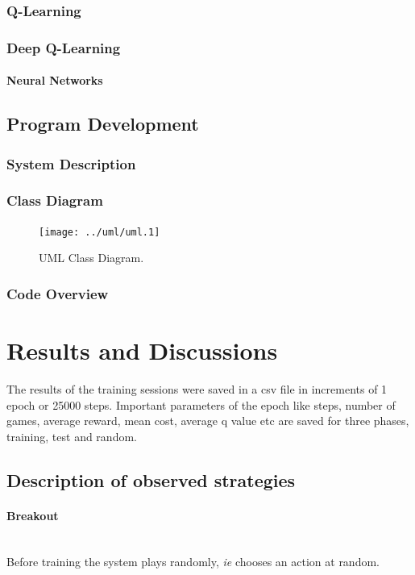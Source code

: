 \documentclass[a4paper,11pt]{article}
\newcommand{\mparagraph}[1]{\paragraph{#1}\mbox{}\\}
\begin{document}
			\subsubsection{Q-Learning}
			\subsubsection{Deep Q-Learning}
				\paragraph{Neural Networks}

		\subsection{Program Development}
			\subsubsection{System Description}
			\subsubsection{Class Diagram}
				\begin{figure}[!h]
					\begin{centering}
						\texttt{[image: ../uml/uml.1]}
						\caption{UML Class Diagram.}
					\end{centering}
				\end{figure}
			\subsubsection{Code Overview}

	\section{Results and Discussions}
		The results of the training sessions were saved in a csv file in increments of 1 epoch or 25000 steps. Important parameters of the epoch like steps, number of games, average reward, mean cost, average q value etc are saved for three phases, training, test and random.


		\subsection{Description of observed strategies}
			\mparagraph{Breakout}
				Before training the system plays randomly, \emph{ie} chooses an action at random. 
\end{document}
